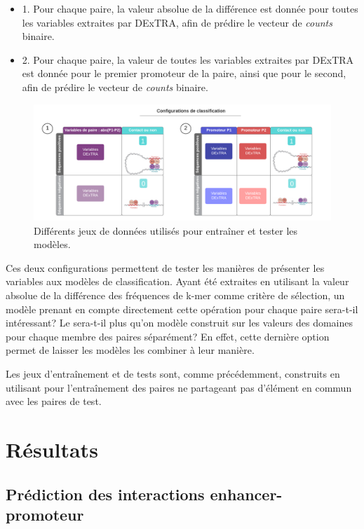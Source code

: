 \documentclass[french]{llncs}
\begin{document}
\begin{itemize}
    \item 1. Pour chaque paire, la valeur absolue de la différence est donnée pour toutes les variables extraites par DExTRA, afin de prédire le vecteur de \textit{counts} binaire.
    \item 2. Pour chaque paire, la valeur de toutes les variables extraites par DExTRA  est donnée pour le premier promoteur de la paire, ainsi que pour le second, afin de prédire le vecteur de \textit{counts} binaire.
\end{itemize}

\begin{figure}[h]
\begin{center}
 	\includegraphics[width=1\linewidth]{Images_Dextra/Dataset_promoters.png}
 \caption{Différents jeux de données utilisés pour entraîner et tester les modèles.}
 \label{fig:dataset_configs}
\end{center}
\end{figure}

Ces deux configurations permettent de tester les manières de présenter les variables aux modèles de classification. Ayant été extraites en utilisant la valeur absolue de la différence des fréquences de k-mer comme critère de sélection, un modèle prenant en compte directement cette opération pour chaque paire sera-t-il intéressant? Le sera-t-il plus qu'on modèle construit sur les valeurs des domaines pour chaque membre des paires séparément? En effet, cette dernière option permet de laisser les modèles les combiner à leur manière.

Les jeux d'entraînement et de tests sont, comme précédemment, construits en utilisant pour l'entraînement des paires ne partageant pas d'élément en commun avec les paires de test.
\section{Résultats}

\subsection{Prédiction des interactions enhancer-promoteur} \label{section:res_EP}
\end{document}
